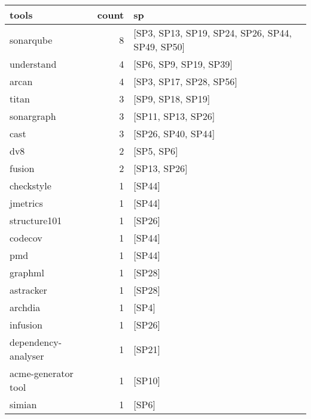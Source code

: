 \begin{tabular}{lrl}
\toprule
               tools &  count &                                               sp \\
\midrule
           sonarqube &      8 &  [SP3, SP13, SP19, SP24, SP26, SP44, SP49, SP50] \\
          understand &      4 &                           [SP6, SP9, SP19, SP39] \\
               arcan &      4 &                          [SP3, SP17, SP28, SP56] \\
               titan &      3 &                                [SP9, SP18, SP19] \\
          sonargraph &      3 &                               [SP11, SP13, SP26] \\
                cast &      3 &                               [SP26, SP40, SP44] \\
                 dv8 &      2 &                                       [SP5, SP6] \\
              fusion &      2 &                                     [SP13, SP26] \\
          checkstyle &      1 &                                           [SP44] \\
            jmetrics &      1 &                                           [SP44] \\
        structure101 &      1 &                                           [SP26] \\
             codecov &      1 &                                           [SP44] \\
                 pmd &      1 &                                           [SP44] \\
             graphml &      1 &                                           [SP28] \\
           astracker &      1 &                                           [SP28] \\
             archdia &      1 &                                            [SP4] \\
            infusion &      1 &                                           [SP26] \\
 dependency-analyser &      1 &                                           [SP21] \\
 acme-generator tool &      1 &                                           [SP10] \\
              simian &      1 &                                            [SP6] \\

\end{tabular}
